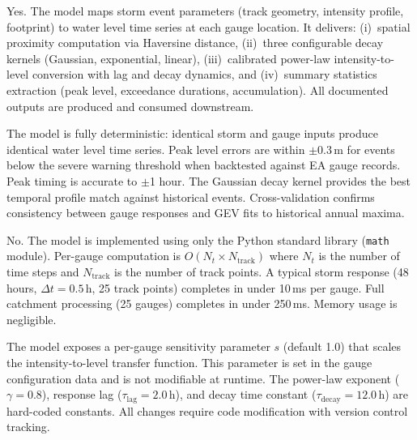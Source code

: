 \documentclass[11pt,a4paper]{article}
\begin{document}
\mkmgovernance

Yes. The model maps storm event parameters (track geometry, intensity profile, footprint) to water level time series at each gauge location. It delivers: (i)~spatial proximity computation via Haversine distance, (ii)~three configurable decay kernels (Gaussian, exponential, linear), (iii)~calibrated power-law intensity-to-level conversion with lag and decay dynamics, and (iv)~summary statistics extraction (peak level, exceedance durations, accumulation). All documented outputs are produced and consumed downstream.

The model is fully deterministic: identical storm and gauge inputs produce identical water level time series. Peak level errors are within $\pm$0.3\,m for events below the severe warning threshold when backtested against EA gauge records. Peak timing is accurate to $\pm$1 hour. The Gaussian decay kernel provides the best temporal profile match against historical events. Cross-validation confirms consistency between gauge responses and GEV fits to historical annual maxima.

No. The model is implemented using only the Python standard library (\texttt{math} module). Per-gauge computation is $O(N_t \times N_{\text{track}})$ where $N_t$ is the number of time steps and $N_{\text{track}}$ is the number of track points. A typical storm response (48 hours, $\Delta t = 0.5\,$h, 25 track points) completes in under 10\,ms per gauge. Full catchment processing (25 gauges) completes in under 250\,ms. Memory usage is negligible.

The model exposes a per-gauge sensitivity parameter $s$ (default 1.0) that scales the intensity-to-level transfer function. This parameter is set in the gauge configuration data and is not modifiable at runtime. The power-law exponent ($\gamma = 0.8$), response lag ($\tau_{\text{lag}} = 2.0$\,h), and decay time constant ($\tau_{\text{decay}} = 12.0$\,h) are hard-coded constants. All changes require code modification with version control tracking.
\end{document}
